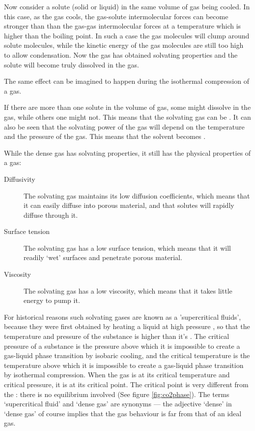 Now consider a solute (solid or liquid) in the same volume of gas being cooled.
In this case, as the gas cools, the gas-solute intermolecular forces can become
stronger than than the gas-gas intermolecular forces at a temperature which is
higher than the boiling point. In such a case the gas molecules will clump
around solute molecules, while the kinetic energy of the gas molecules are still
too high to allow condensation. Now the gas has obtained solvating properties
and the solute will become truly dissolved in the gas.

The same effect can be imagined to happen during the isothermal compression of a
gas.

If there are more than one solute in the volume of gas, some might dissolve in
the gas, while others one might not. This means that the solvating gas can be
. It can also be seen that the solvating power of the gas will
depend on the temperature and the pressure of the gas. This means that the
solvent becomes .

While the dense gas has solvating properties, it still has the physical
properties of a gas:

\begin{description} 

\item[Diffusivity] The solvating gas maintains its low diffusion coefficients,
which means that it can easily diffuse into porous material, and that solutes
will rapidly diffuse through it.

\item[Surface tension] The solvating gas has a low surface tension, which means
that it will readily `wet' surfaces and penetrate porous material.

\item[Viscosity] The solvating gas has a low viscosity, which means that it
takes little energy to pump it.

\end{description} 

For historical reasons such solvating gases are known as a 'supercritical
fluids', because they were first obtained by heating a liquid at high pressure
\autocite{Berche2009}, so that the temperature and pressure of the substance is
higher than it's . The critical pressure of a substance
is the pressure above which it is impossible to create a gas-liquid phase
transition by isobaric cooling, and the critical temperature is the temperature
above which it is impossible to create a gas-liquid phase transition by
isothermal compression. When the gas is at its critical temperature and critical
pressure, it is at its critical point. The critical point is very different from
the : there is no equilibrium involved (See figure
\ref{fig:co2phase}). The terms `supercritical fluid' and `dense gas' are
synonyms \autocite{Randall1982} --- the adjective `dense' in `dense gas' of
course implies that the gas behaviour is far from that of an ideal gas.

